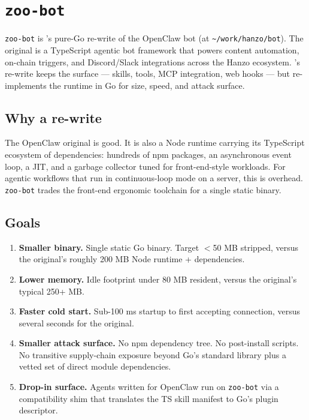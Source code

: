 \section{\texttt{zoo-bot}}
\label{sec:zoo-bot}

\texttt{zoo-bot} is \Zoo{}'s pure-Go re-write of the \Hanzo{} OpenClaw bot
(at \texttt{\textasciitilde/work/hanzo/bot}). The original is a TypeScript
agentic bot framework that powers content automation, on-chain triggers,
and Discord/Slack integrations across the Hanzo ecosystem. \Zoo{}'s
re-write keeps the surface --- skills, tools, MCP integration, web
hooks --- but re-implements the runtime in Go for size, speed, and
attack surface.

\subsection{Why a re-write}

The OpenClaw original is good. It is also a Node runtime carrying its
TypeScript ecosystem of dependencies: hundreds of npm packages, an
asynchronous event loop, a JIT, and a garbage collector tuned for
front-end-style workloads. For agentic workflows that run in
continuous-loop mode on a server, this is overhead. \texttt{zoo-bot}
trades the front-end ergonomic toolchain for a single static binary.

\subsection{Goals}

\begin{enumerate}[leftmargin=1.4em]
  \item \textbf{Smaller binary.} Single static Go binary. Target $<$50 MB
        stripped, versus the original's roughly 200 MB Node
        runtime + dependencies.
  \item \textbf{Lower memory.} Idle footprint under 80 MB resident,
        versus the original's typical 250+ MB.
  \item \textbf{Faster cold start.} Sub-100 ms startup to first
        accepting connection, versus several seconds for the original.
  \item \textbf{Smaller attack surface.} No npm dependency tree. No
        post-install scripts. No
        transitive supply-chain exposure beyond Go's standard library
        plus a vetted set of direct module dependencies.
  \item \textbf{Drop-in surface.} Agents written for OpenClaw run on
        \texttt{zoo-bot} via a compatibility shim that translates the
        TS skill manifest to Go's plugin descriptor.
\end{enumerate}

